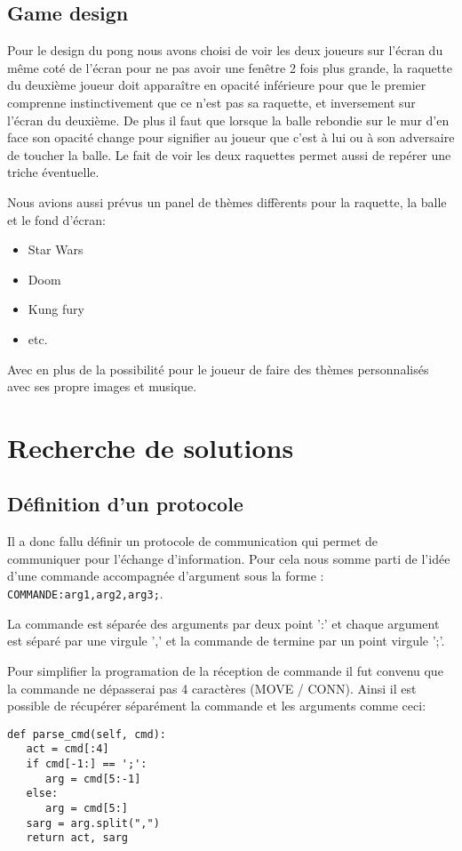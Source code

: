 \documentclass[12pt]{report}
\begin{document}
\chapter{Game design}
Pour le design du pong nous avons choisi de voir les deux joueurs sur l'écran
du même coté de l'écran pour ne pas avoir une fenêtre 2 fois plus grande,
la raquette du deuxième joueur doit apparaître en opacité inférieure pour que
le premier comprenne instinctivement que ce n'est pas sa raquette, et inversement
sur l'écran du deuxième.
De plus il faut que lorsque la balle rebondie sur le mur d'en face son opacité
change pour signifier au joueur que c'est à lui ou à son adversaire de toucher la
balle.
Le fait de voir les deux raquettes permet aussi de repérer une triche éventuelle.

Nous avions aussi prévus un panel de thèmes diffèrents pour la
raquette, la balle et le fond d'écran:
\begin{itemize}
\item Star Wars
\item Doom
\item Kung fury
\item etc.
\end{itemize}
Avec en plus de la possibilité pour le joueur de faire des thèmes personnalisés
avec ses propre images et musique.

\part{Recherche de solutions}
\chapter{Définition d'un protocole}
Il a donc fallu définir un protocole de communication qui permet de communiquer
pour l'échange d'information.
Pour cela nous somme parti de l'idée d'une commande accompagnée d'argument sous la
forme : \texttt{COMMANDE:arg1,arg2,arg3;}.

La commande est séparée des arguments par deux point ':' et chaque argument est
séparé par une virgule ',' et la commande de termine par un point virgule ';'.

Pour simplifier la programation de la réception de commande il fut convenu
que la commande ne dépasserai pas 4 caractères (MOVE / CONN). Ainsi il est
possible de récupérer séparément la commande et les arguments comme ceci:
\begin{verbatim}
def parse_cmd(self, cmd):
   act = cmd[:4]
   if cmd[-1:] == ';':
      arg = cmd[5:-1]
   else:
      arg = cmd[5:]
   sarg = arg.split(",")
   return act, sarg
\end{verbatim}
\end{document}
